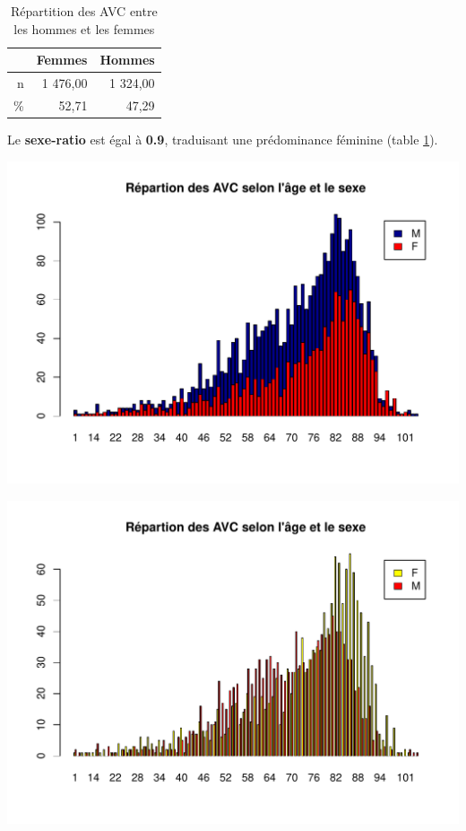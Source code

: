 \documentclass[12pt,english,french,twoside]{book}\usepackage[]{graphicx}\usepackage[]{color}
\makeatletter
\def\maxwidth{ %
  \ifdim\Gin@nat@width>\linewidth
    \linewidth
  \else
    \Gin@nat@width
  \fi
}
\newenvironment{knitrout}{}{} %
\makeatother
\begin{document}

\begin{table}[ht]
\centering
\begin{tabular}{rrr}
  \hline
 & Femmes & Hommes \\ 
  \hline
n & 1 476,00 & 1 324,00 \\ 
  \% & 52,71 & 47,29 \\ 
   \hline
\end{tabular}
\caption[AVC et sexe]{Répartition des AVC entre les hommes et les femmes} 
\label{tab:sr_avc}
\end{table}


Le \textbf{sexe-ratio} est égal à \textbf{0.9}, traduisant une prédominance féminine (table \ref{tab:sr_avc}).

\begin{knitrout}
\color{fgcolor}
\includegraphics[width=\maxwidth]{figure/avc_sexe2-1} 

\includegraphics[width=\maxwidth]{figure/avc_sexe2-2} 

\end{knitrout}
\end{document}
